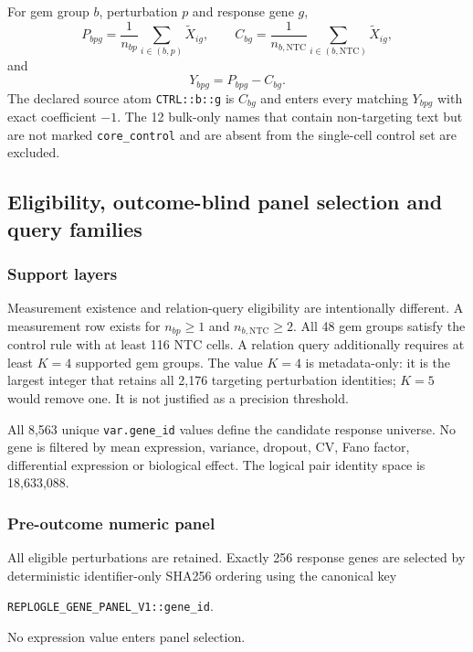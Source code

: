 \documentclass[11pt]{article}
\begin{document}
For gem group $b$, perturbation $p$ and response gene $g$,
\[
P_{bpg}=\frac{1}{n_{bp}}\sum_{i\in(b,p)}\widetilde X_{ig},\qquad
C_{bg}=\frac{1}{n_{b,\mathrm{NTC}}}\sum_{i\in(b,\mathrm{NTC})}\widetilde X_{ig},
\]
and
\[
Y_{bpg}=P_{bpg}-C_{bg}.
\]
The declared source atom \texttt{CTRL::b::g} is $C_{bg}$ and enters every matching $Y_{bpg}$ with exact coefficient $-1$. The 12 bulk-only names that contain non-targeting text but are not marked \texttt{core\_control} and are absent from the single-cell control set are excluded.


\subsection{Eligibility, outcome-blind panel selection and query families}
\subsubsection{Support layers}
Measurement existence and relation-query eligibility are intentionally different. A measurement row exists for $n_{bp}\ge1$ and $n_{b,\mathrm{NTC}}\ge2$. All 48 gem groups satisfy the control rule with at least 116 NTC cells. A relation query additionally requires at least $K=4$ supported gem groups. The value $K=4$ is metadata-only: it is the largest integer that retains all 2,176 targeting perturbation identities; $K=5$ would remove one. It is not justified as a precision threshold.

All 8,563 unique \texttt{var.gene\_id} values define the candidate response universe. No gene is filtered by mean expression, variance, dropout, CV, Fano factor, differential expression or biological effect. The logical pair identity space is 18,633,088.

\subsubsection{Pre-outcome numeric panel}
All eligible perturbations are retained. Exactly 256 response genes are selected by deterministic identifier-only SHA256 ordering using the canonical key
\begin{center}
\texttt{REPLOGLE\_GENE\_PANEL\_V1::gene\_id}.
\end{center}
No expression value enters panel selection.
\end{document}
